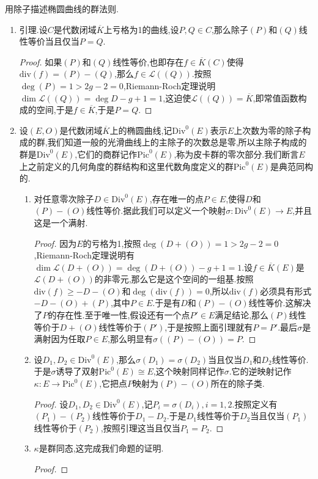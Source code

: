 用除子描述椭圆曲线的群法则.
\begin{enumerate}
	\item 引理.设$C$是代数闭域$\overline{K}$上亏格为1的曲线,设$P,Q\in C$,那么除子$(P)$和$(Q)$线性等价当且仅当$P=Q$.
	\begin{proof}
		
		如果$(P)$和$(Q)$线性等价,也即存在$f\in\overline{K}(C)$使得$\mathrm{div}(f)=(P)-(Q)$,那么$f\in\mathscr{L}((Q))$.按照$\deg(P)=1>2g-2=0$,Riemann-Roch定理说明$\dim\mathscr{L}((Q))=\deg D-g+1=1$,这迫使$\mathscr{L}((Q))=\overline{K}$,即常值函数构成的空间,于是$f\in\overline{K}$,于是$P=Q$.
	\end{proof}
	\item 设$(E,O)$是代数闭域$\overline{K}$上的椭圆曲线,记$\mathrm{Div}^0(E)$表示$E$上次数为零的除子构成的群,我们知道一般的光滑曲线上的主除子的次数总是零,所以主除子构成的群是$\mathrm{Div}^0(E)$,它们的商群记作$\mathrm{Pic}^0(E)$,称为皮卡群的零次部分.我们断言$E$上之前定义的几何角度的群结构和这里代数角度定义的群$\mathrm{Pic}^0(E)$是典范同构的.
	\begin{enumerate}
		\item 对任意零次除子$D\in\mathrm{Div}^0(E)$,存在唯一的点$P\in E$,使得$D$和$(P)-(O)$线性等价.据此我们可以定义一个映射$\sigma:\mathrm{Div}^0(E)\to E$,并且这是一个满射.
		\begin{proof}
			
			因为$E$的亏格为1,按照$\deg(D+(O))=1>2g-2=0$,Riemann-Roch定理说明有$\dim\mathscr{L}(D+(O))=\deg(D+(O))-g+1=1$.设$f\in\overline{K}(E)$是$\mathscr{L}(D+(O))$的非零元,那么它是这个空间的一组基.按照$\mathrm{div}(f)\ge-D-(O)$和$\deg(\mathrm{div}(f))=0$,所以$\mathrm{div}(f)$必须具有形式$-D-(O)+(P)$,其中$P\in E$.于是有$D$和$(P)-(O)$线性等价.这解决了$P$的存在性.至于唯一性,假设还有一个点$P'\in E$满足结论,那么$(P)$线性等价于$D+(O)$线性等价于$(P')$,于是按照上面引理就有$P=P'$.最后$\sigma$是满射因为任取$P\in E$,那么明显有$\sigma((P)-(O))=P$.
		\end{proof}
		\item 设$D_1,D_2\in\mathrm{Div}^0(E)$,那么$\sigma(D_1)=\sigma(D_2)$当且仅当$D_1$和$D_2$线性等价.于是$\sigma$诱导了双射$\mathrm{Pic}^0(E)\cong E$,这个映射同样记作$\sigma$.它的逆映射记作$\kappa:E\to\mathrm{Pic}^0(E)$,它把点$P$映射为$(P)-(O)$所在的除子类.
		\begin{proof}
			
			设$D_1,D_2\in\mathrm{Div}^0(E)$,记$P_i=\sigma(D_i),i=1,2$.按照定义有$(P_1)-(P_2)$线性等价于$D_1-D_2$.于是$D_1$线性等价于$D_2$当且仅当$(P_1)$线性等价于$(P_2)$,按照引理这当且仅当$P_1=P_2$.
		\end{proof}
		\item $\kappa$是群同态,这完成我们命题的证明.
		\begin{proof}
			

\end{proof}
\end{enumerate}
\end{enumerate}
